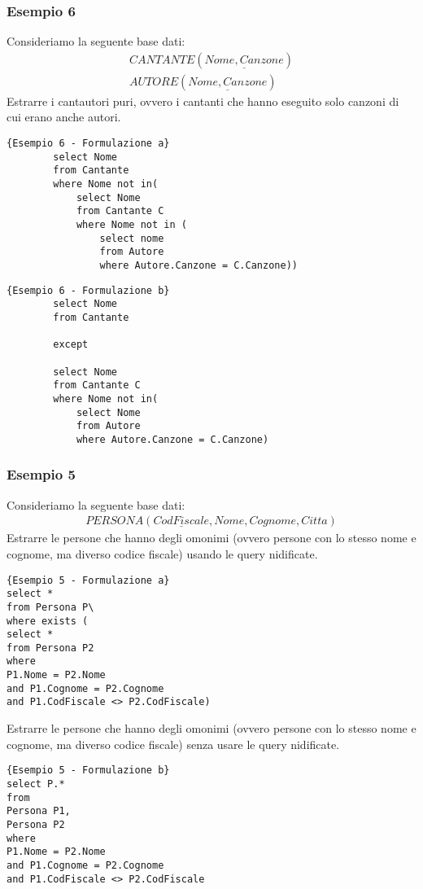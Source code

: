 \subsubsection{Esempio 6}
Consideriamo la seguente base dati:
	\begin{equation}\begin{aligned}
		CANTANTE (\underline{Nome, Canzone})\\
		AUTORE (\underline{Nome, Canzone})
	\end{aligned}\end{equation}
Estrarre i cantautori puri, ovvero i cantanti che hanno eseguito solo canzoni di cui erano anche autori.
	\begin{lstlisting}{Esempio 6 - Formulazione a}
		select Nome
		from Cantante
		where Nome not in(
			select Nome
			from Cantante C
			where Nome not in (
				select nome
				from Autore
				where Autore.Canzone = C.Canzone))
	\end{lstlisting}
	\begin{lstlisting}{Esempio 6 - Formulazione b}
		select Nome
		from Cantante
		
		except
		
		select Nome
		from Cantante C
		where Nome not in(
			select Nome
			from Autore
			where Autore.Canzone = C.Canzone)
	\end{lstlisting}


\subsubsection{Esempio 5}
Consideriamo la seguente base dati:
\begin{equation}\begin{aligned}
PERSONA (\underline{CodFiscale}, Nome, Cognome, Citta)
\end{aligned}\end{equation}
Estrarre le persone che hanno degli omonimi (ovvero persone con lo stesso nome e cognome, ma diverso codice fiscale) usando le query nidificate.
\begin{lstlisting}{Esempio 5 - Formulazione a}
select *
from Persona P\
where exists (
select *
from Persona P2
where 
P1.Nome = P2.Nome
and P1.Cognome = P2.Cognome
and P1.CodFiscale <> P2.CodFiscale)
\end{lstlisting}
Estrarre le persone che hanno degli omonimi (ovvero persone con lo stesso nome e cognome, ma diverso codice fiscale) senza usare le query nidificate.
\begin{lstlisting}{Esempio 5 - Formulazione b}
select P.*
from
Persona P1,
Persona P2
where
P1.Nome = P2.Nome
and P1.Cognome = P2.Cognome
and P1.CodFiscale <> P2.CodFiscale
\end{lstlisting}

